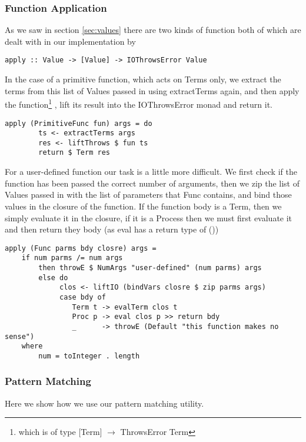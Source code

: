 \subsubsection{Function Application}

As we saw in section \ref{sec:values} there are two kinds of function both of which are dealt with in our implementation by
\begin{verbatim}
apply :: Value -> [Value] -> IOThrowsError Value 
\end{verbatim}

In the case of a primitive function, which acts on Terms only, we extract the terms from this list of Values passed in using extractTerms again, and then apply the function\footnote{which is of type $[$Term$]$ $\rightarrow$ ThrowsError Term} , lift its result into the IOThrowsError monad and return it.
\begin{verbatim}
apply (PrimitiveFunc fun) args = do
        ts <- extractTerms args
        res <- liftThrows $ fun ts
        return $ Term res
\end{verbatim}

For a user-defined function our task is a little more difficult. We first check if the function has been passed the correct number of arguments, then we zip the list of Values passed in with the list of parameters that Func contains, and bind those values in the closure of the function. If the function body is a Term, then we simply evaluate it in the closure, if it is a Process then we must first evaluate it and then return they body (as eval has a return type of ()) 
\begin{verbatim}
apply (Func parms bdy closre) args =
    if num parms /= num args 
        then throwE $ NumArgs "user-defined" (num parms) args
        else do
             clos <- liftIO (bindVars closre $ zip parms args)
             case bdy of
                Term t -> evalTerm clos t
                Proc p -> eval clos p >> return bdy
                _      -> throwE (Default "this function makes no sense")
    where
        num = toInteger . length
\end{verbatim}

\subsubsection{Pattern Matching}
\label{sec:letpatterns}

Here we show how we use our pattern matching utility.

